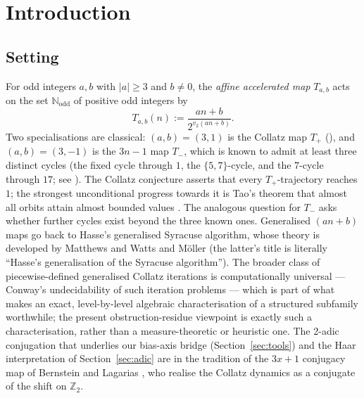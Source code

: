 \documentclass[11pt,reqno]{amsart}
\theoremstyle{plain}
\theoremstyle{definition}
\theoremstyle{remark}
\newcommand{\Tab}{T_{a,b}}
\newcommand{\Tneg}{T_{-}}
\newcommand{\Tpos}{T_{+}}
\newcommand{\N}{\mathbb{N}}
\newcommand{\Ztwo}{\mathbb{Z}_{2}}
\newcommand{\Nodd}{\N_{\mathrm{odd}}}
\newcommand{\vtwo}{v_{2}}
\begin{document}
\maketitle

\section{Introduction}\label{sec:intro}

\subsection{Setting}

For odd integers $a, b$ with $\lvert a \rvert \ge 3$ and $b \ne 0$, the
\emph{affine accelerated map} $\Tab$ acts on the set $\Nodd$ of positive
odd integers by
\[
\Tab(n) := \frac{an + b}{2^{\vtwo(an + b)}}.
\]
Two specialisations are classical: $(a,b) = (3,1)$ is the Collatz map
$\Tpos$ (\cite{Lagarias2010,Lagarias2010bib}), and $(a,b) = (3,-1)$ is
the $3n-1$ map $\Tneg$, which is known to admit at least three distinct
cycles (the fixed cycle through $1$, the $\{5,7\}$-cycle, and the
$7$-cycle through $17$; see \cite{Lagarias2010bib}). The Collatz
conjecture asserts that every $\Tpos$-trajectory reaches $1$; the
strongest unconditional progress towards it is Tao's theorem that
almost all orbits attain almost bounded values
\cite{Tao2022}. The analogous question for $\Tneg$ asks whether further
cycles exist beyond the three known ones. Generalised $(an+b)$ maps go back to
Hasse's generalised Syracuse algorithm, whose theory is developed by
Matthews and Watts \cite{MatthewsWatts1984} and M\"oller
\cite{Moeller1978} (the latter's title is literally ``Hasse's
generalisation of the Syracuse algorithm''). The broader class of
piecewise-defined generalised Collatz iterations is computationally
universal --- Conway's undecidability of such iteration problems
\cite{Conway1972} --- which is part of what makes an exact,
level-by-level algebraic characterisation of a structured subfamily
worthwhile; the present obstruction-residue viewpoint is exactly such a
characterisation, rather than a measure-theoretic or heuristic one. The
2-adic conjugation that underlies our bias-axis bridge
(Section~\ref{sec:tools}) and the Haar interpretation of
Section~\ref{sec:adic} are
in the tradition of the $3x+1$ conjugacy map of Bernstein and Lagarias
\cite{BernsteinLagarias1996}, who realise the Collatz dynamics as a
conjugate of the shift on $\Ztwo$.
\end{document}
